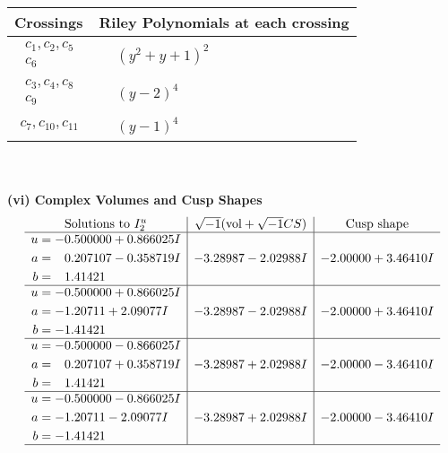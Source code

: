\documentclass[1p]{elsarticle_modified}
\theoremstyle{definition}
\newcommand{\I}{\sqrt{-1}}
\begin{document}
\begin{tabular}{m{50pt}|m{274pt}}
Crossings & \hspace{64pt}Riley Polynomials at each crossing \\
\hline $$\begin{aligned}c_{1},c_{2},c_{5}\\c_{6}\end{aligned}$$&$\begin{aligned}
&(y^2+y+1)^2
\end{aligned}$\\
\hline $$\begin{aligned}c_{3},c_{4},c_{8}\\c_{9}\end{aligned}$$&$\begin{aligned}
&(y-2)^4
\end{aligned}$\\
\hline $$\begin{aligned}c_{7},c_{10},c_{11}\end{aligned}$$&$\begin{aligned}
&(y-1)^4
\end{aligned}$\\
\hline
\end{tabular}\\~\\
\newpage\flushleft \textbf{(vi) Complex Volumes and Cusp Shapes}
$$\begin{array}{c|c|c}  
\text{Solutions to }I^u_{2}& \I (\text{vol} + \sqrt{-1}CS) & \text{Cusp shape}\\
 \hline 
\begin{aligned}
u &= -0.500000 + 0.866025 I \\
a &= \phantom{-}0.207107 - 0.358719 I \\
b &= \phantom{-}1.41421\phantom{ +0.000000I}\end{aligned}
 & -3.28987 - 2.02988 I & -2.00000 + 3.46410 I \\ \hline\begin{aligned}
u &= -0.500000 + 0.866025 I \\
a &= -1.20711 + 2.09077 I \\
b &= -1.41421\phantom{ +0.000000I}\end{aligned}
 & -3.28987 - 2.02988 I & -2.00000 + 3.46410 I \\ \hline\begin{aligned}
u &= -0.500000 - 0.866025 I \\
a &= \phantom{-}0.207107 + 0.358719 I \\
b &= \phantom{-}1.41421\phantom{ +0.000000I}\end{aligned}
 & -3.28987 + 2.02988 I & -2.00000 - 3.46410 I \\ \hline\begin{aligned}
u &= -0.500000 - 0.866025 I \\
a &= -1.20711 - 2.09077 I \\
b &= -1.41421\phantom{ +0.000000I}\end{aligned}
 & -3.28987 + 2.02988 I & -2.00000 - 3.46410 I\\
 \hline 
 \end{array}$$\newpage\newpage\renewcommand{\arraystretch}{1}
\end{document}
